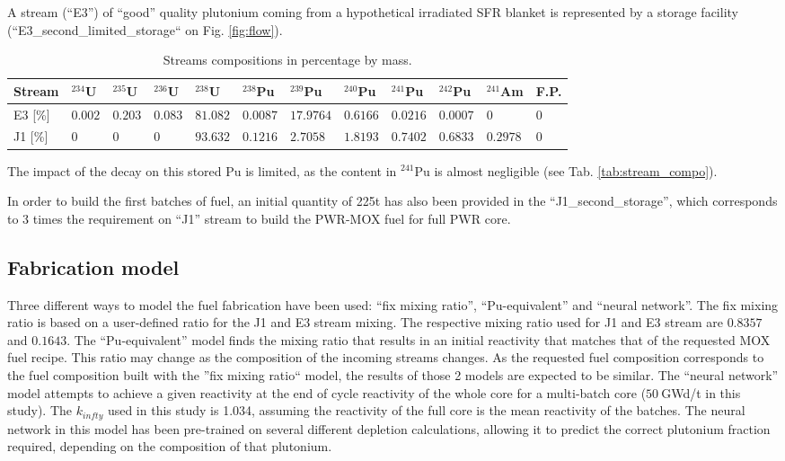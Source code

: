 \documentclass{anstrans}
\begin{document}
A stream (``E3'') of ``good'' quality plutonium coming from a hypothetical irradiated
SFR blanket is represented by a storage facility
(``E3\_second\_limited\_storage`` on Fig. \ref{fig:flow}).

\begin{table}[htb]
  \centering
  \begin{tabular}{llllllllllll}\toprule
    Stream 
    & $^{234}$U   & $^{235}$U   & $^{236}$U   & $^{238}$U   
    & $^{238}$Pu  & $^{239}$Pu  & $^{240}$Pu  & $^{241}$Pu  & $^{242}$Pu 
    & $^{241}$Am  & F.P. \\ \midrule
    E3 [\%]
    & $0.002$   & $0.203$    & $0.083$   & $81.082$
    & $0.0087$  & $17.9764$  & $0.6166$  & $0.0216$  & $0.0007$
    & $0$         & $0$ \\
    J1 [\%]
    & $0$       & $0$        & $0$       & $93.632$
    & $0.1216$  & $2.7058$   & $1.8193$  & $0.7402$  & $0.6833$
    & $0.2978$  & $0$ \\
    \bottomrule
  \end{tabular}
  \caption{Streams compositions in percentage by mass.}
  \label{tab:strem_compo}
\end{table}

The impact of the decay on this stored Pu is limited, as the content in
$^{241}$Pu is almost negligible (see Tab. \ref{tab:stream_compo}).  
 
In order to build the first batches of fuel, an initial quantity of 225t has
also been provided in the ``J1\_second\_storage'', which corresponds to 3 times
the requirement on ``J1'' stream to build the PWR-MOX fuel for full PWR
core. 




\subsection{Fabrication model}
Three different ways to model the fuel fabrication have been used: ``fix mixing
ratio'', ``Pu-equivalent'' and ``neural network''.
The fix mixing ratio is based on a user-defined ratio for the J1 and E3 stream
mixing. The respective mixing ratio used for J1 and E3 stream are 
$0.8357$ and $0.1643$.
The ``Pu-equivalent'' model finds the mixing ratio that results in an initial
reactivity that matches that of the requested MOX fuel recipe.  This ratio may
change as the composition of the incoming streams changes.  As the requested
fuel composition corresponds to the fuel composition built with the ''fix mixing
ratio`` model, the results of those 2 models are expected to be similar.  The
``neural network'' model attempts to achieve a given reactivity at the  end of
cycle reactivity of the whole core for a multi-batch core ($50~$GWd/t in this
study). The $k_{infty}$ used in this study is 1.034, assuming the reactivity of
the full core is the mean reactivity of the batches. The neural network in this
model has been pre-trained on several different depletion calculations, allowing
it to predict the correct plutonium fraction required, depending on the
composition of that plutonium.
\end{document}
